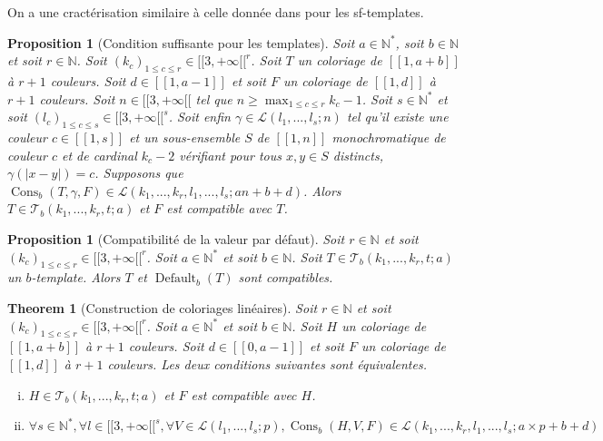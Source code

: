 \documentclass{article}
\newtheorem{theorem}[definition]{Theorem}
\newtheorem{proposition}[definition]{Proposition}
\DeclareMathOperator{\cons}{Cons}
\DeclareMathOperator{\coldef}{Default}
\begin{document}
On a une cractérisation similaire à celle donnée dans \cite{RowleyRamsey} pour les sf-templates.
\begin{proposition}[Condition suffisante pour les templates]
Soit \(a \in \mathbb{N}^*\), soit \(b \in \mathbb{N}\) et soit \(r \in \mathbb{N}\). Soit \((k_c)_{1 \leqslant c \leqslant r} \in {[\![3, + \infty [\![}^r\). Soit \(T\) un coloriage de \([\![1,  a + b]\!]\) à \(r + 1\) couleurs. Soit \(d \in [\![1, a - 1 ]\!]\) et soit \(F\) un coloriage de \([\![1, d]\!]\) à \(r + 1\) couleurs. Soit \(n \in [\![3, + \infty [\![\) tel que \(n \geqslant \max_{1 \leqslant c \leqslant r} k_c - 1\). Soit \(s \in \mathbb{N}^*\) et soit \((l_c)_{1 \leqslant c \leqslant s} \in {[\![3, + \infty [\![}^s\). Soit enfin \(\gamma \in \mathcal{L}(l_1, ..., l_s; n)\) tel qu'il existe une couleur \(c \in [\![1, s]\!]\) et un sous-ensemble \(S\) de \([\![1, n]\!]\) monochromatique de couleur \(c\) et de cardinal \(k_c - 2\) vérifiant pour tous \(x, y \in S\) distincts, \(\gamma(|x - y|) = c\). Supposons que \(\cons_b(T, \gamma, F) \in \mathcal{L}(k_1, ..., k_r, l_1, ..., l_s; a n + b + d)\). Alors \(T \in \mathcal{T}_b(k_1, ..., k_r, t; a)\) et \(F\) est compatible avec \(T\).
\end{proposition}

\begin{proposition}[Compatibilité de la valeur par défaut]
Soit \(r \in \mathbb{N}\) et soit \((k_c)_{1 \leqslant c \leqslant r}  \in {[\![3, +\infty[\![}^r\). Soit \(a \in \mathbb{N}^*\) et soit \(b \in \mathbb{N}\). Soit \(T \in \mathcal{T}_b(k_1, ..., k_r, t; a)\) un \(b\)-template. Alors \(T\) et \(\coldef_b(T)\) sont compatibles.
\end{proposition}

\begin{theorem}[Construction de coloriages linéaires]
\label{thm:b-temp}
Soit \(r \in \mathbb{N}\) et soit \((k_c)_{1 \leqslant c \leqslant r} \in {[\![3, +\infty[\![}^r\). Soit \(a \in \mathbb{N}^*\) et soit \(b \in \mathbb{N}\). Soit \(H\) un coloriage de \([\![1, a + b]\!]\) à \(r + 1\) couleurs. Soit \(d \in [\![0, a - 1]\!]\) et soit \(F\) un coloriage de \([\![1, d]\!]\) à \(r + 1\) couleurs. Les deux conditions suivantes sont équivalentes.

\begin{enumerate}[(i)]
\item \(H \in \mathcal{T}_b(k_1, ..., k_r, t; a)\) et \(F\) est compatible  avec \(H\).
\item \(\forall s \in \mathbb{N}^*, \forall l \in {[\![3, +\infty[\![}^s, \forall V \in \mathcal{L}(l_1, ..., l_s ; p), \cons_b(H, V, F) \in  \mathcal{L}(k_1, ..., k_r, l_1, ..., l_s ; a \times p + b + d)\)
\end{enumerate}
\end{theorem}
\end{document}
